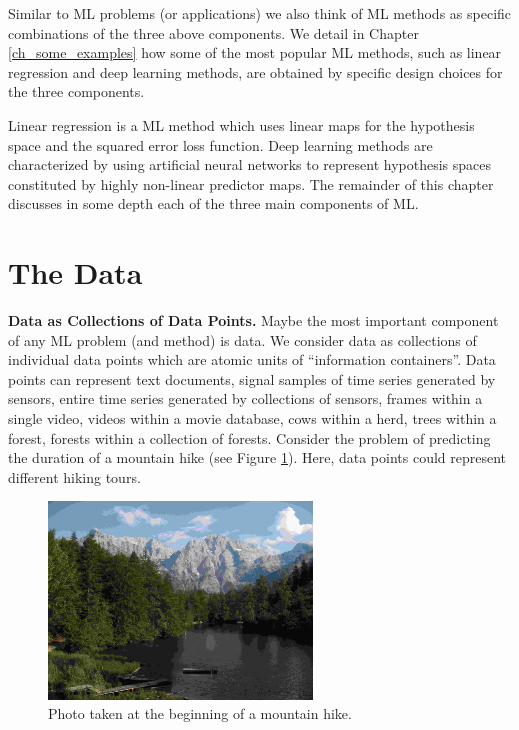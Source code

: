 \documentclass[12pt]{report}
\begin{document}
Similar to ML problems (or applications) we also think of ML 
methods as specific combinations of the three above components. 
We detail in Chapter \ref{ch_some_examples} how some of the 
most popular ML methods, such as linear regression and deep 
learning methods, are obtained by specific design choices for 
the three components. 

Linear regression is a ML method which uses linear maps for 
the hypothesis space and the squared error loss function. 
Deep learning methods are characterized by using artificial 
neural networks to represent hypothesis spaces constituted 
by highly non-linear predictor maps. The remainder of this 
chapter discusses in some depth each of the three main 
components of ML. 





\section{The Data}
\label{sec_the_data}

{\bf Data as Collections of Data Points.} Maybe the most important 
component of any ML problem (and method) is data. We consider 
data as collections of individual data points which are atomic units 
of ``information containers''. Data points can represent text documents, 
signal samples of time series generated by sensors, entire time series 
generated by collections of sensors, frames within a single video, 
videos within a movie database, cows within a herd, trees within a 
forest, forests within a collection of forests. Consider the problem 
of predicting the duration of a mountain hike (see Figure \ref{fig:image}). 
Here, data points could represent different hiking tours.  

\begin{figure}[htbp]
	\centering
	\includegraphics[width=7cm]{BergSee1.jpg}
	\caption{Photo taken at the beginning of a mountain hike.}
	\label{fig:image}
\end{figure}
\end{document}
